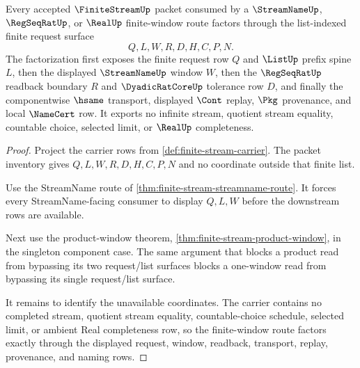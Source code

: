 \begin{theorem}
\label{thm:finite-stream-window-factorization}
Every accepted $\FiniteStreamUp$ packet consumed by a $\StreamNameUp$, $\RegSeqRatUp$, or $\RealUp$ finite-window route factors through the list-indexed finite request surface
$$
Q,L,W,R,D,H,C,P,N.
$$
The factorization first exposes the finite request row $Q$ and $\ListUp$ prefix spine $L$, then the displayed $\StreamNameUp$ window $W$, then the $\RegSeqRatUp$ readback boundary $R$ and $\DyadicRatCoreUp$ tolerance row $D$, and finally the componentwise $\hsame$ transport, displayed $\Cont$ replay, $\Pkg$ provenance, and local $\NameCert$ row. It exports no infinite stream, quotient stream equality, countable choice, selected limit, or $\RealUp$ completeness.
\end{theorem}
\begin{proof}
Project the carrier rows from \autoref{def:finite-stream-carrier}. The packet inventory gives $Q,L,W,R,D,H,C,P,N$ and no coordinate outside that finite list.

Use the StreamName route of \autoref{thm:finite-stream-streamname-route}. It forces every StreamName-facing consumer to display $Q,L,W$ before the downstream rows are available.

Next use the product-window theorem, \autoref{thm:finite-stream-product-window}, in the singleton component case. The same argument that blocks a product read from bypassing its two request/list surfaces blocks a one-window read from bypassing its single request/list surface.

It remains to identify the unavailable coordinates. The carrier contains no completed stream, quotient stream equality, countable-choice schedule, selected limit, or ambient Real completeness row, so the finite-window route factors exactly through the displayed request, window, readback, transport, replay, provenance, and naming rows.
\end{proof}



